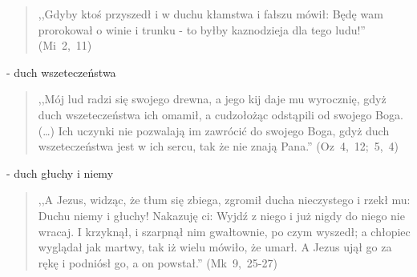 \documentclass[10pt,a4paper,oneside]{article}
\begin{document}
\begin{quote}
,,Gdyby ktoś przyszedł i w duchu kłamstwa i fałszu mówił: Będę wam prorokował o winie i trunku - to byłby kaznodzieja dla tego ludu!'' \mbox{(Mi 2, 11)}
\end{quote}
- duch wszeteczeństwa
\begin{quote}
,,Mój lud radzi się swojego drewna, a jego kij daje mu wyrocznię, gdyż duch wszeteczeństwa ich omamił, a cudzołożąc odstąpili od swojego Boga. (\ldots) Ich uczynki nie pozwalają im zawrócić do swojego Boga, gdyż duch wszeteczeństwa jest w ich sercu, tak że nie znają Pana.'' \mbox{(Oz 4, 12; 5, 4)}
\end{quote}
- duch głuchy i niemy
\begin{quote}
,,A Jezus, widząc, że tłum się zbiega, zgromił ducha nieczystego i rzekł mu: Duchu niemy i głuchy! Nakazuję ci: Wyjdź z niego i już nigdy do niego nie wracaj. I krzyknął, i szarpnął nim gwałtownie, po czym wyszedł; a chłopiec wyglądał jak martwy, tak iż wielu mówiło, że umarł. A Jezus ujął go za rękę i podniósł go, a on powstał.'' \mbox{(Mk 9, 25-27)}
\end{quote}
\end{document}
